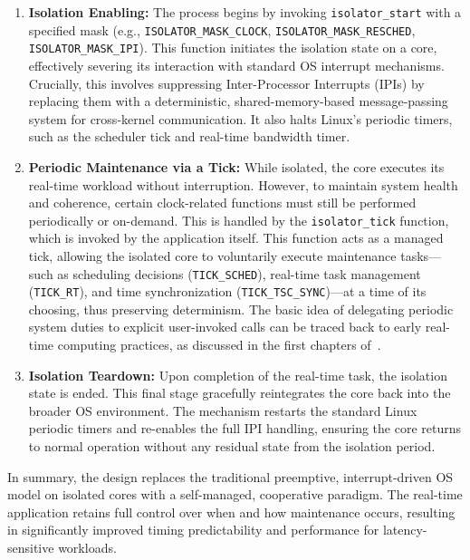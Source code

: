 \documentclass[letterpaper]{article}
\begin{document}
\begin{enumerate}
    \item \textbf{Isolation Enabling:} The process begins by invoking \texttt{isolator\_start} with a specified mask (e.g., \texttt{ISOLATOR\_MASK\_CLOCK}, \texttt{ISOLATOR\_MASK\_RESCHED}, \texttt{ISOLATOR\_MASK\_IPI}). This function initiates the isolation state on a core, effectively severing its interaction with standard OS interrupt mechanisms. Crucially, this involves suppressing Inter-Processor Interrupts (IPIs) by replacing them with a deterministic, shared-memory-based message-passing system for cross-kernel communication. It also halts Linux's periodic timers, such as the scheduler tick and real-time bandwidth timer.

    \item \textbf{Periodic Maintenance via a Tick:} While isolated, the core executes its real-time workload without interruption. However, to maintain system health and coherence, certain clock-related functions must still be performed periodically or on-demand. This is handled by the \texttt{isolator\_tick} function, which is invoked by the application itself. This function acts as a managed tick, allowing the isolated core to voluntarily execute maintenance tasks---such as scheduling decisions (\texttt{TICK\_SCHED}), real-time task management (\texttt{TICK\_RT}), and time synchronization (\texttt{TICK\_TSC\_SYNC})---at a time of its choosing, thus preserving determinism. The basic idea of delegating periodic system duties to explicit user-invoked calls can be traced back to early real-time computing practices, as discussed in the first chapters of~\cite{mellichamp1983}.

    \item \textbf{Isolation Teardown:} Upon completion of the real-time task, the isolation state is ended. This final stage gracefully reintegrates the core back into the broader OS environment. The mechanism restarts the standard Linux periodic timers and re-enables the full IPI handling, ensuring the core returns to normal operation without any residual state from the isolation period.
\end{enumerate}

In summary, the design replaces the traditional preemptive, interrupt-driven OS model on isolated cores with a self-managed, cooperative paradigm. The real-time application retains full control over when and how maintenance occurs, resulting in significantly improved timing predictability and performance for latency-sensitive workloads.
\end{document}
